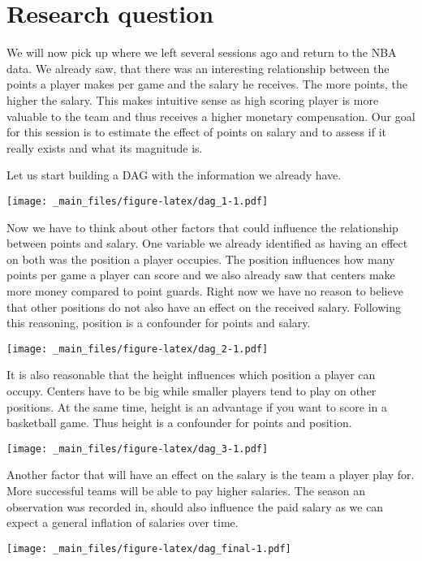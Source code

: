\documentclass[
]{book}
\begin{document}
\hypertarget{research-question}{%
\section{Research question}\label{research-question}}

We will now pick up where we left several sessions ago and return to the NBA
data. We already saw, that there was an interesting relationship between the
points a player makes per game and the salary he receives. The more points, the
higher the salary. This makes intuitive sense as high scoring player is more
valuable to the team and thus receives a higher monetary compensation. Our
goal for this session is to estimate the effect of points on salary and to
assess if it really exists and what its magnitude is.

Let us start building a DAG with the information we already have.

\texttt{[image: \_main\_files/figure-latex/dag\_1-1.pdf]}

Now we have to think about other factors that could influence the relationship
between points and salary. One variable we already identified as having an
effect on both was the position a player occupies. The position influences how
many points per game a player can score and we also already saw that centers
make more money compared to point guards. Right now we have no reason to believe
that other positions do not also have an effect on the received salary.
Following this reasoning, position is a confounder for points and salary.

\texttt{[image: \_main\_files/figure-latex/dag\_2-1.pdf]}

It is also reasonable that the height influences which position a
player can occupy. Centers have to be big while smaller players tend to play on
other positions. At the same time, height is an advantage if you want to score
in a basketball game. Thus height is a confounder for points and position.

\texttt{[image: \_main\_files/figure-latex/dag\_3-1.pdf]}

Another factor that will have an effect on the salary is the team a player play
for. More successful teams will be able to pay higher salaries. The season an
observation was recorded in, should also influence the paid salary as we can
expect a general inflation of salaries over time.

\texttt{[image: \_main\_files/figure-latex/dag\_final-1.pdf]}
\end{document}
